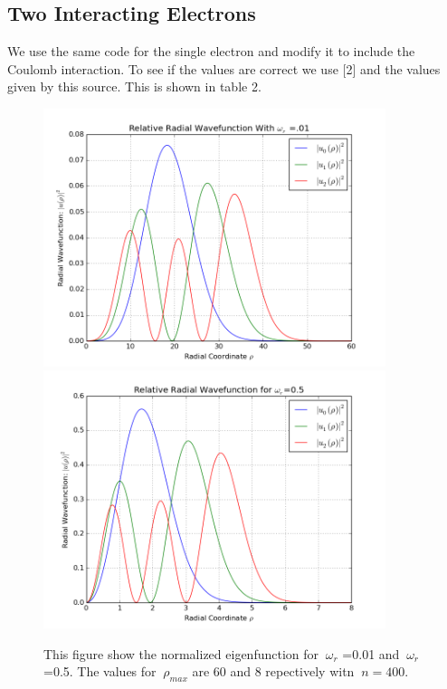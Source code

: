 \documentclass[11pt,a4wide]{article}
\begin{document}
\subsection{Two Interacting Electrons}
We use the same code for the single electron and modify it to include the Coulomb interaction. To see if the values are correct we use [2] and the values given by this source. This is shown in table 2.
\begin{figure}[H]
\centering
\includegraphics[width=100mm]{I_01.png}
\includegraphics[width=100mm]{I_5.png}
\caption{This figure show the normalized eigenfunction for $\ \omega_r$ =0.01 and $\ \omega_r$=0.5. The values for $\ \rho_{max}$ are 60 and 8 repectively witn $\ n=400$. \label{overflow}}
\end{figure}
\end{document}
